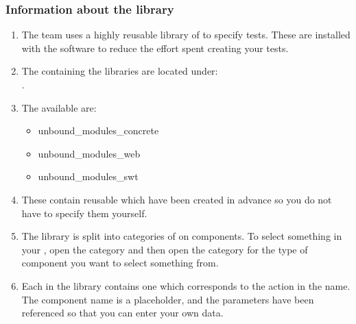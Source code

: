 \subsubsection{Information about the library}
\label{LibraryInformation}
\begin{enumerate}
\item The \gd{} team uses a highly reusable library of \gdcases{} to specify tests. These \gdcases{} are installed with the software to reduce the effort spent creating your tests.  
\item The \gdprojects{} containing the \gdcase{} libraries are located under:\\
.

\item The \gdprojects{} available are:
\begin{itemize}
\item unbound\_modules\_concrete
\item unbound\_modules\_web
\item unbound\_modules\_swt
\end{itemize}

\item These \gdprojects{} contain reusable \gdcases{} which have been created in advance so you do not have to specify them yourself.
\item The library is split into categories of  on components. To select something in your \gdaut{}, open the  category and then open the category for the type of component you want to select something from. 

\item Each \gdcase{} in the library contains one \gdstep{} which corresponds to the action in the \gdcase{} name. The component name is a placeholder, and the parameters have been referenced so that you can enter your own data. 

 



\end{enumerate}

